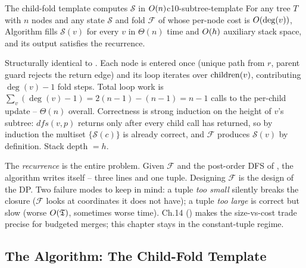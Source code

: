 \begin{theorem}{The child-fold template computes $\mathcal S$ in $O(n)$}{c10-subtree-template}
For any tree $T$ with $n$ nodes and any state $\mathcal S$ and fold $\mathcal F$
of  whose per-node cost is $O(\deg(v))$,
Algorithm  fills $\mathcal S(v)$ for every $v$ in
$\Theta(n)$ time and $O(h)$ auxiliary stack space, and its output
satisfies the recurrence.
\end{theorem}
\begin{proofbox}
Structurally identical to . Each node is entered once
(unique path from $r$, parent guard rejects the return edge) and its loop
iterates over $\operatorname{children}(v)$, contributing $\deg(v)-1$ fold steps. Total
loop work is $\sum_v (\deg(v)-1) = 2(n-1) - (n-1) = n-1$ calls to the
per-child update -- $\Theta(n)$ overall. Correctness is strong induction on
the height of $v$'s subtree: $\mathit{dfs}(v,p)$ returns only after every
child call has returned, so by induction the multiset
$\{\mathcal S(c)\}$ is already correct, and $\mathcal F$ produces
$\mathcal S(v)$ by definition. Stack depth $=h$.
\end{proofbox}

\begin{insightbox}
The \emph{recurrence} is the entire problem. Given $\mathcal F$ and the
post-order DFS of , the algorithm writes itself -- three
lines and one tuple. Designing $\mathcal F$ is the design of the DP.
Two failure modes to keep in mind: a tuple \emph{too small} silently breaks
the closure ($\mathcal F$ looks at coordinates it does not have); a tuple
\emph{too large} is correct but slow (worse $O(\mathfrak T)$, sometimes
worse time). Ch.14 () makes the size-vs-cost trade precise for
budgeted merges; this chapter stays in the constant-tuple regime.
\end{insightbox}

\subsection{The Algorithm: The Child-Fold Template}

